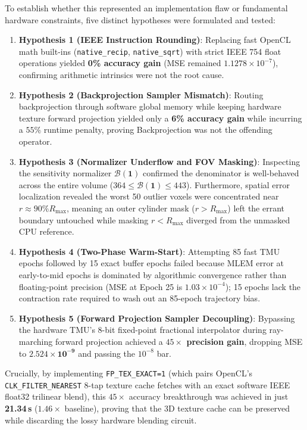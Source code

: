 \documentclass[11pt,a4paper]{article}
\begin{document}
To establish whether this represented an implementation flaw or fundamental hardware constraints, five distinct hypotheses were formulated and tested:
\begin{enumerate}[leftmargin=*]
    \item \textbf{Hypothesis 1 (IEEE Instruction Rounding)}: Replacing fast OpenCL math built-ins (\texttt{native\_recip}, \texttt{native\_sqrt}) with strict IEEE 754 float operations yielded \textbf{0\% accuracy gain} (MSE remained $1.1278 \times 10^{-7}$), confirming arithmetic intrinsics were not the root cause.
    \item \textbf{Hypothesis 2 (Backprojection Sampler Mismatch)}: Routing backprojection through software global memory while keeping hardware texture forward projection yielded only a \textbf{6\% accuracy gain} while incurring a $55\%$ runtime penalty, proving Backprojection was not the offending operator.
    \item \textbf{Hypothesis 3 (Normalizer Underflow and FOV Masking)}: Inspecting the sensitivity normalizer $\mathcal{B}(\mathbf{1})$ confirmed the denominator is well-behaved across the entire volume ($364 \le \mathcal{B}(\mathbf{1}) \le 443$). Furthermore, spatial error localization revealed the worst 50 outlier voxels were concentrated near $r \approx 90\% R_{\max}$, meaning an outer cylinder mask ($r > R_{\max}$) left the errant boundary untouched while masking $r < R_{\max}$ diverged from the unmasked CPU reference.
    \item \textbf{Hypothesis 4 (Two-Phase Warm-Start)}: Attempting 85 fast TMU epochs followed by 15 exact buffer epochs failed because MLEM error at early-to-mid epochs is dominated by algorithmic convergence rather than floating-point precision (MSE at Epoch 25 is $1.03 \times 10^{-4}$); 15 epochs lack the contraction rate required to wash out an 85-epoch trajectory bias.
    \item \textbf{Hypothesis 5 (Forward Projection Sampler Decoupling)}: Bypassing the hardware TMU's 8-bit fixed-point fractional interpolator during ray-marching forward projection achieved a \textbf{$45\times$ precision gain}, dropping MSE to $\mathbf{2.524 \times 10^{-9}}$ and passing the $10^{-8}$ bar.
\end{enumerate}

Crucially, by implementing \texttt{FP\_TEX\_EXACT=1} (which pairs OpenCL's \texttt{CLK\_FILTER\_NEAREST} 8-tap texture cache fetches with an exact software IEEE float32 trilinear blend), this $45\times$ accuracy breakthrough was achieved in just \textbf{21.34\,s} ($1.46\times$ baseline), proving that the 3D texture cache can be preserved while discarding the lossy hardware blending circuit.
\end{document}
